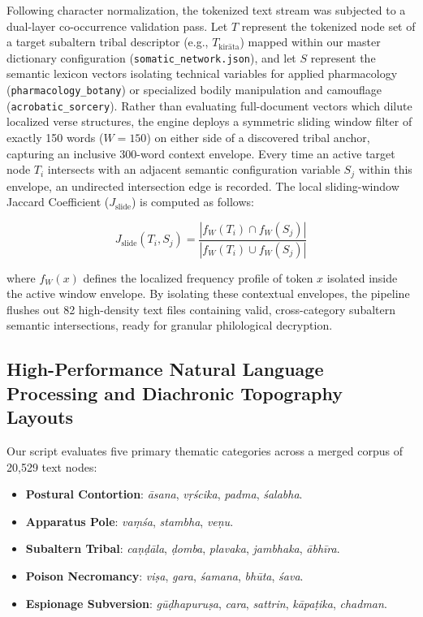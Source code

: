 \documentclass[11pt,twoside,letterpaper]{article}
\begin{document}
Following character normalization, the tokenized text stream was subjected to a dual-layer co-occurrence validation pass. Let $T$ represent the tokenized node set of a target subaltern tribal descriptor (e.g., $T_{\text{kirāta}}$) mapped within our master dictionary configuration (\texttt{somatic\_network.json}), and let $S$ represent the semantic lexicon vectors isolating technical variables for applied pharmacology (\texttt{pharmacology\_botany}) or specialized bodily manipulation and camouflage (\texttt{acrobatic\_sorcery}). Rather than evaluating full-document vectors which dilute localized verse structures, the engine deploys a symmetric sliding window filter of exactly 150 words ($W = 150$) on either side of a discovered tribal anchor, capturing an inclusive 300-word context envelope. Every time an active target node $T_i$ intersects with an adjacent semantic configuration variable $S_j$ within this envelope, an undirected intersection edge is recorded. The local sliding-window Jaccard Coefficient ($J_{\text{slide}}$) is computed as follows:

\begin{equation}
J_{\text{slide}}(T_i, S_j) = \frac{|f_W(T_i) \cap f_W(S_j)|}{|f_W(T_i) \cup f_W(S_j)|}
\end{equation}

where $f_W(x)$ defines the localized frequency profile of token $x$ isolated inside the active window envelope. By isolating these contextual envelopes, the pipeline flushes out 82 high-density text files containing valid, cross-category subaltern semantic intersections, ready for granular philological decryption.

\subsection{High-Performance Natural Language Processing and Diachronic Topography Layouts}
Our script evaluates five primary thematic categories across a merged corpus of 20,529 text nodes:

\begin{itemize}
    \item \textbf{Postural Contortion}: \textit{āsana}, \textit{vṛścika}, \textit{padma}, \textit{śalabha}.
    \item \textbf{Apparatus Pole}: \textit{vaṃśa}, \textit{stambha}, \textit{veṇu}.
    \item \textbf{Subaltern Tribal}: \textit{caṇḍāla}, \textit{ḍomba}, \textit{plavaka}, \textit{jambhaka}, \textit{ābhīra}.
    \item \textbf{Poison Necromancy}: \textit{viṣa}, \textit{gara}, \textit{śamana}, \textit{bhūta}, \textit{śava}.
    \item \textbf{Espionage Subversion}: \textit{gūḍhapuruṣa}, \textit{cara}, \textit{sattrin}, \textit{kāpaṭika}, \textit{chadman}.
\end{itemize}
\end{document}
